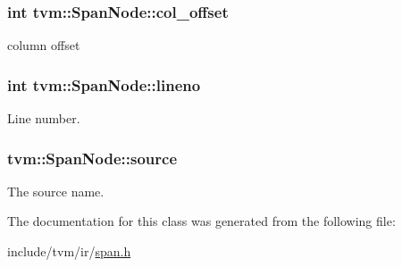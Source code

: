 \subsubsection[{\texorpdfstring{col\+\_\+offset}{col_offset}}]{\setlength{\rightskip}{0pt plus 5cm}int tvm\+::\+Span\+Node\+::col\+\_\+offset}\hypertarget{classtvm_1_1SpanNode_a78d2dc28f35d2625b95697de63a16264}{}\label{classtvm_1_1SpanNode_a78d2dc28f35d2625b95697de63a16264}


column offset 

\subsubsection[{\texorpdfstring{lineno}{lineno}}]{\setlength{\rightskip}{0pt plus 5cm}int tvm\+::\+Span\+Node\+::lineno}\hypertarget{classtvm_1_1SpanNode_ad605e038c640219d8372d83ae68f2173}{}\label{classtvm_1_1SpanNode_ad605e038c640219d8372d83ae68f2173}


Line number. 

\subsubsection[{\texorpdfstring{source}{source}}]{ tvm\+::\+Span\+Node\+::source}\hypertarget{classtvm_1_1SpanNode_afde422b06b0b110c002b543770360f84}{}\label{classtvm_1_1SpanNode_afde422b06b0b110c002b543770360f84}


The source name. 



The documentation for this class was generated from the following file\+:\begin{DoxyCompactItemize}
\item 
include/tvm/ir/\hyperlink{span_8h}{span.\+h}\end{DoxyCompactItemize}
